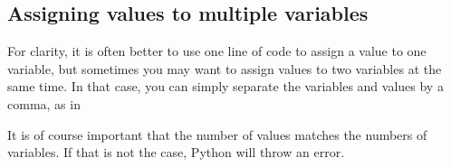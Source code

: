 \documentclass[letterpaper,10pt,english]{jupyterBook}
\begin{document}
\subsection{Assigning values to multiple variables}
\label{\detokenize{notebooks/01_GettingStarted/01_GettingStarted_student:assigning-values-to-multiple-variables}}
\sphinxAtStartPar
For clarity, it is often better to use one line of code to assign a value to one variable, but sometimes you may want to assign values to two variables at the same time. In that case, you can simply separate the variables and values by a comma, as in

\begin{sphinxVerbatim}[commandchars=\\\{\}]
      
\end{sphinxVerbatim}

\sphinxAtStartPar
It is of course important that the number of values matches the numbers of variables. If that is not the case, Python will throw an error.
\end{document}
